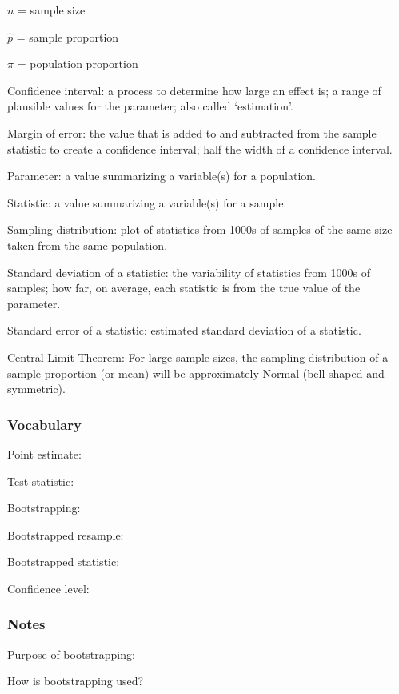 \documentclass[
]{report}
\newcommand{\rgs}{\vspace{12pt}} %
\begin{document}
\(n\) = sample size

\(\hat{p}\) = sample proportion

\(\pi\) = population proportion

Confidence interval: a process to determine how large an effect is; a range of plausible values for the parameter; also called `estimation'.

Margin of error: the value that is added to and subtracted from the sample statistic to create a confidence interval; half the width of a confidence interval.

Parameter: a value summarizing a variable(s) for a population.

Statistic: a value summarizing a variable(s) for a sample.

Sampling distribution: plot of statistics from 1000s of samples of the same size taken from the same population.

Standard deviation of a statistic: the variability of statistics from 1000s of samples; how far, on average, each statistic is from the true value of the parameter.

Standard error of a statistic: estimated standard deviation of a statistic.

Central Limit Theorem: For large sample sizes, the sampling distribution of a sample proportion (or mean) will be approximately Normal (bell-shaped and symmetric).

\hypertarget{vocabulary-14}{%
\subsubsection*{Vocabulary}\label{vocabulary-14}}

Point estimate:
\rgs

Test statistic:
\rgs

Bootstrapping:
\rgs

Bootstrapped resample:
\rgs

Bootstrapped statistic:
\rgs

Confidence level:
\rgs

\hypertarget{notes-18}{%
\subsubsection*{Notes}\label{notes-18}}

Purpose of bootstrapping:
\rgs

How is bootstrapping used?\\
\rgs
\end{document}
